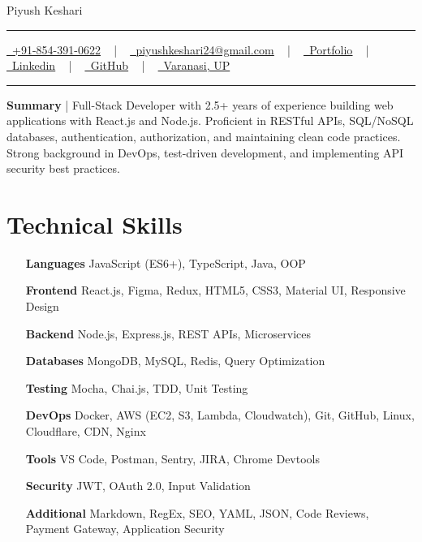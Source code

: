 \documentclass[letterpaper, 10pt]{article}
\newcommand{\documentTitle}[2]{
\begin{center}
	{\Huge\color{accentTitle} #1}
	\vspace{2pt}
	{\color{accentLine} \hrule height 0.8pt}
	\vspace{1pt}
	\footnotesize{#2}
	\vspace{1pt}
	{\color{accentLine} \hrule height 0.8pt}
\end{center}
}
\newcommand{\tinysection}[1]{ \phantomsection
\addcontentsline{toc}{section}{#1}
{\large{\bfseries\color{accentText}#1} {\color{accentLine} |}}
\vspace{0.4pt}
}
\begin{document}
	\documentTitle{Piyush Keshari}{ \href{tel:+918543910622}{\underline{ \raisebox{-0.05\height}{\faPhone}\ +91-854-391-0622}} ~ | ~ \href{mailto:piyushkeshari24@gmail.com}{\underline{ \raisebox{-0.15\height}{\faEnvelope}\ piyushkeshari24@gmail.com}} ~ | ~ \href{https://kesharipiyush24.github.io/}{\underline{ \raisebox{-0.15\height}{\faGlobe}\ Portfolio}} ~ | ~ \href{https://linkedin.com/in/piyush-k-ba3a67134}{\underline{ \raisebox{-0.15\height}{\faLinkedin}\ Linkedin}} ~ | ~ \href{https://github.com/KeshariPiyush24}{\underline{ \raisebox{-0.15\height}{\faGithub}\ GitHub}} ~ | ~ \underline{ \raisebox{-0.15\height}{\faMapMarker}\ Varanasi, UP} }

	\tinysection{Summary} Full-Stack Developer with 2.5+ years of experience
	building web applications with React.js and Node.js. Proficient in RESTful APIs, SQL/NoSQL databases, authentication, authorization, and maintaining clean code practices. Strong background in DevOps, test-driven development, and implementing API security best practices.

	\section{Technical Skills}
	\begin{multicols}{2}
		\begin{itemize}[itemsep=-2pt, parsep=0.5pt, leftmargin=65pt]
			\item[\textbf{Languages}] JavaScript (ES6+), TypeScript, Java, OOP

			\item[\textbf{Frontend}] React.js, Figma, Redux, HTML5, CSS3, Material UI,
				Responsive Design

			\item[\textbf{Backend}] Node.js, Express.js, REST APIs, Microservices

			\item[\textbf{Databases}] MongoDB, MySQL, Redis, Query Optimization

			\item[\textbf{Testing}] Mocha, Chai.js, TDD, Unit Testing

			\item[\textbf{DevOps}] Docker, AWS (EC2, S3, Lambda, Cloudwatch), Git, GitHub,
				Linux, Cloudflare, CDN, Nginx

			\item[\textbf{Tools}] VS Code, Postman, Sentry, JIRA, Chrome Devtools

			\item[\textbf{Security}] JWT, OAuth 2.0, Input Validation

			\item[\textbf{Additional}] Markdown, RegEx, SEO, YAML, JSON, Code Reviews,
				Payment Gateway, Application Security
		\end{itemize}
	\end{multicols}
\end{document}
